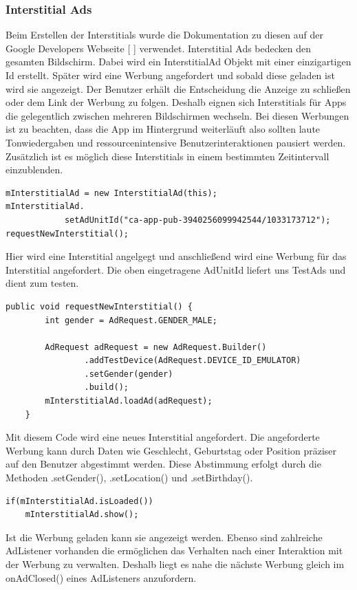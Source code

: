 \documentclass[FIPLY_base.tex]{subfiles}
\begin{document}
\subsubsection{Interstitial Ads}
Beim Erstellen der Interstitials wurde die Dokumentation zu diesen auf der Google Developers Webseite [ \cite{gdInterstitials}] verwendet. \newline 
Interstitial Ads bedecken den gesamten Bildschirm. 
Dabei wird ein InterstitialAd Objekt mit einer einzigartigen Id erstellt. Später wird eine Werbung angefordert und sobald diese geladen ist wird sie angezeigt. Der Benutzer erhält die Entscheidung die Anzeige zu schließen oder dem Link der Werbung zu folgen. Deshalb eignen sich Interstitials für Apps die gelegentlich zwischen mehreren Bildschirmen wechseln.
Bei diesen Werbungen ist zu beachten, dass die App im Hintergrund weiterläuft also sollten laute Tonwiedergaben und ressourcenintensive Benutzerinteraktionen pausiert werden. Zusätzlich ist es möglich diese Interstitials in einem bestimmten Zeitintervall einzublenden.
\ \\
\begin{lstlisting}
mInterstitialAd = new InterstitialAd(this);
mInterstitialAd.
       		setAdUnitId("ca-app-pub-3940256099942544/1033173712");
requestNewInterstitial();
\end{lstlisting}
Hier wird eine Interstitial angelgegt und anschließend wird eine Werbung für das Interstitial angefordert. 
Die oben eingetragene AdUnitId liefert uns TestAds und dient zum testen.
\ \\
\begin{lstlisting}
public void requestNewInterstitial() {
        int gender = AdRequest.GENDER_MALE;
        
        AdRequest adRequest = new AdRequest.Builder()
                .addTestDevice(AdRequest.DEVICE_ID_EMULATOR)
                .setGender(gender)
                .build();
        mInterstitialAd.loadAd(adRequest);
    }
\end{lstlisting}
Mit diesem Code wird eine neues Interstitial angefordert. Die angeforderte Werbung kann durch Daten wie Geschlecht, Geburtstag oder Position präziser auf den Benutzer abgestimmt werden.
Diese Abstimmung erfolgt durch die Methoden .setGender(), .setLocation() und .setBirthday().	
\ \\
\begin{lstlisting}
if(mInterstitialAd.isLoaded()) 
    mInterstitialAd.show();
\end{lstlisting}
Ist die Werbung geladen kann sie angezeigt werden.\newline
Ebenso sind zahlreiche AdListener vorhanden die ermöglichen das Verhalten nach einer Interaktion mit der Werbung zu verwalten.
Deshalb liegt es nahe die nächste Werbung gleich im onAdClosed() eines AdListeners anzufordern.





\begin{lstlisting}
\end{lstlisting}
\end{document}
